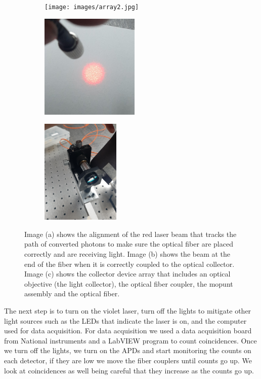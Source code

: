 \documentclass[12pt]{book}
\begin{document}
\begin{figure}[t!]
\centering
\begin{subfigure}[b]{0.3\linewidth}
\texttt{[image: images/array2.jpg]}
\caption{}
\end{subfigure}
\begin{subfigure}[b]{0.3\linewidth}
\includegraphics[width=\linewidth,height=5cm]{images/outfibre.jpg}
\caption{}
\end{subfigure}
\begin{subfigure}[b]{0.3\linewidth}
\includegraphics[width=\linewidth,height=5cm]{images/fibre.jpg}
\caption{}
\end{subfigure}
\caption{Image (a) shows the alignment of the red laser beam that tracks the path of converted photons to make sure the optical fiber are placed correctly and are receiving light. Image (b) shows the  beam at the end of the fiber when it is correctly coupled to the optical collector. Image (c) shows the collector device array that includes  an optical objective (the light collector), the optical fiber coupler, the mopunt assembly and the optical fiber.}
\label{fig:coupler}
\end{figure}

The next step is to turn on the violet laser, turn off the lights to mitigate other light sources such as the LEDs that indicate the laser is on, and the computer used for data acquisition. For data acquisition we used a data acquisition board from National instruments and a LabVIEW program to count coincidences. Once we turn off the lights, we turn on the APDs and start monitoring the counts on each detector, if they are low we move the fiber couplers until counts go up. We look at coincidences as well being careful that they increase as the counts go up.
\end{document}
